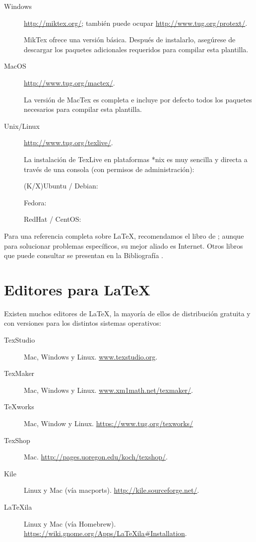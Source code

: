 \begin{description}
\item [Windows] \href{http://miktex.org/}{http://miktex.org/}; también puede
ocupar \href{http://www.tug.org/protext/}{http://www.tug.org/protext/}.

MikTex ofrece una versión básica. Después de instalarlo, asegúrese de descargar los paquetes adicionales requeridos para compilar esta plantilla.

\item [MacOS] \href{http://www.tug.org/mactex/}{http://www.tug.org/mactex/}.

La versión de MacTex es completa e incluye por defecto todos los paquetes necesarios para compilar esta plantilla.

\item [Unix/Linux] \href{http://www.tug.org/texlive/}{http://www.tug.org/texlive/}.

La instalación de TexLive en plataformas *nix es muy sencilla y directa a través de una consola (con permisos de administración):

(K/X)Ubuntu / Debian: 

Fedora: 

RedHat / CentOS: 
\end{description}

Para una referencia completa sobre \LaTeX{}, recomendamos el libro
de \citealp{Lamport94}; aunque para solucionar problemas específicos,
su mejor aliado es Internet. Otros libros que puede consultar se presentan
en la Bibliografía \citep{Mittelbach04,Oetiker06,Roberts05}.


\section{Editores para \LaTeX}
Existen muchos editores de \LaTeX, la mayoría de ellos de distribución gratuita y con versiones para los distintos sistemas operativos:
\begin{description}
    \item [TexStudio] Mac, Windows y Linux. \href{www.texstudio.org}{www.texstudio.org}.
    \item [TexMaker] Mac, Windows y Linux.  \href{www.xm1math.net/texmaker/}{www.xm1math.net/texmaker/}.
    \item[TeXworks] Mac, Window y Linux. \href{https://www.tug.org/texworks/}{https://www.tug.org/texworks/}
    \item [TexShop] Mac. \href{http://pages.uoregon.edu/koch/texshop/}{http://pages.uoregon.edu/koch/texshop/}.
    \item[Kile] Linux y Mac (vía macports). \href{http://kile.sourceforge.net/}{http://kile.sourceforge.net/}.
    \item[LaTeXila] Linux y Mac (vía Homebrew). \href{https://wiki.gnome.org/Apps/LaTeXila\#Installation}{https://wiki.gnome.org/Apps/LaTeXila\#Installation}.
\end{description}
